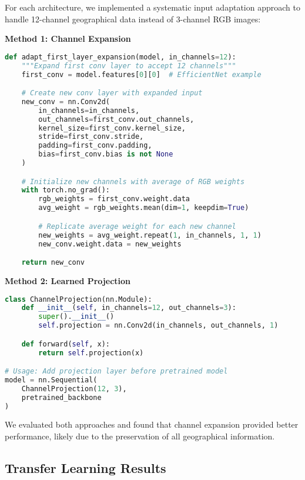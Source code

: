 For each architecture, we implemented a systematic input adaptation approach to handle 12-channel geographical data instead of 3-channel RGB images:

\textbf{Method 1: Channel Expansion}
\begin{lstlisting}[language=Python, caption=Channel Expansion Strategy]
def adapt_first_layer_expansion(model, in_channels=12):
    """Expand first conv layer to accept 12 channels"""
    first_conv = model.features[0][0]  # EfficientNet example

    # Create new conv layer with expanded input
    new_conv = nn.Conv2d(
        in_channels=in_channels,
        out_channels=first_conv.out_channels,
        kernel_size=first_conv.kernel_size,
        stride=first_conv.stride,
        padding=first_conv.padding,
        bias=first_conv.bias is not None
    )

    # Initialize new channels with average of RGB weights
    with torch.no_grad():
        rgb_weights = first_conv.weight.data
        avg_weight = rgb_weights.mean(dim=1, keepdim=True)

        # Replicate average weight for each new channel
        new_weights = avg_weight.repeat(1, in_channels, 1, 1)
        new_conv.weight.data = new_weights

    return new_conv
\end{lstlisting}

\textbf{Method 2: Learned Projection}
\begin{lstlisting}[language=Python, caption=Learned Projection Strategy]
class ChannelProjection(nn.Module):
    def __init__(self, in_channels=12, out_channels=3):
        super().__init__()
        self.projection = nn.Conv2d(in_channels, out_channels, 1)

    def forward(self, x):
        return self.projection(x)

# Usage: Add projection layer before pretrained model
model = nn.Sequential(
    ChannelProjection(12, 3),
    pretrained_backbone
)
\end{lstlisting}

We evaluated both approaches and found that channel expansion provided better performance, likely due to the preservation of all geographical information.

\subsection{Transfer Learning Results}

